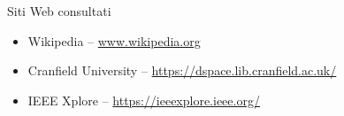 \cleardoublepage
{}
{}
\nocite{*}


%

\vspace{2.5cm}
\begin{Large}Siti Web consultati\end{Large}
\begin{itemize}
    \item Wikipedia -- \url{www.wikipedia.org}
    \item Cranfield University -- \url{https://dspace.lib.cranfield.ac.uk/}
    \item IEEE Xplore -- \url{https://ieeexplore.ieee.org/}
\end{itemize}


